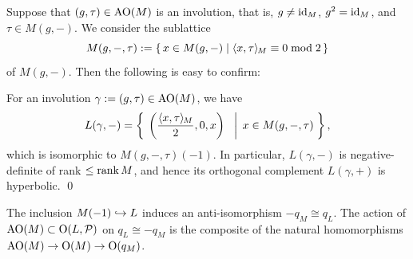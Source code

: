 \documentclass{amsart} %
\begin{document}
%
Suppose that $(g, \tau)\in \mathord{\mathrm{AO}}(M)$ is an involution, 
that is, $g\ne \mathord{\mathrm{id}}_M$, $g^2=\mathord{\mathrm{id}}_M$, and $\tau\in M(g, -)$.
We consider the sublattice 
\[
M(g, -,\tau):=\{\,{x\in M(g, -)}\mid {\langle x, \tau \rangle_{\hskip -1pt M}\equiv 0 \bmod 2} \,\}
\]
of $M(g, -)$.
Then the following is easy to confirm:
%
\begin{proposition}\label{prop:involL}
For an involution $\gamma:=(g, \tau)\in \mathord{\mathrm{AO}}(M)$, we have 
\[
L(\gamma, -)=\left\{\; \left. {\left(\frac{\langle x, \tau \rangle_{\hskip -1pt M}}{2}, 0, x\right)\;\;} \; \right\vert \; {x \in M(g, -,\tau)} \; \right \},
\]
which is isomorphic to 
$M(g, -,\tau)(-1)$.
In particular, 
$L(\gamma, -)$ is negative-definite of rank $\le \operatorname{rank} M$, and 
hence its orthogonal complement 
$L(\gamma, +)$ is hyperbolic.
\qed
\end{proposition}
%
\begin{remark}
The inclusion $M(-1)\hookrightarrow L$ induces an anti-isomorphism $-q_M\cong q_L$.
The action of $\mathord{\mathrm{AO}}(M)\subset \mathord{\mathrm{O}}(L, \mathord{\mathcal{P}})$ on $q_L\cong -q_M$ 
is the composite of the natural homomorphisms $\mathord{\mathrm{AO}}(M) \to \mathord{\mathrm{O}}(M)\to \mathord{\mathrm{O}}(q_M)$.
\end{remark}
%
\end{document}
